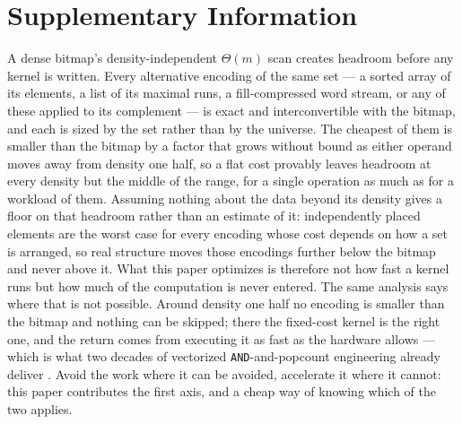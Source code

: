 %
%
\clearpage
\setcounter{figure}{0}
\setcounter{table}{0}
\setcounter{equation}{0}
\renewcommand{\theHequation}{S\arabic{equation}}
\setcounter{section}{0}

\section*{Supplementary Information}


\label{note:headroom}

A dense bitmap's density-independent $\Theta(m)$ scan creates headroom before any kernel is written.
Every alternative encoding of the same
set --- a sorted array of its elements, a list of its maximal runs, a fill-compressed word stream,
or any of these applied to its complement --- is exact and interconvertible with the bitmap, and
each is sized by the set rather than by the universe. The cheapest of them is smaller than the
bitmap by a factor that grows without bound as either operand moves away from density one half, so
a flat cost provably leaves headroom at every density but the middle of the range, for a single
operation as much as for a workload of them. Assuming nothing about the data beyond its density
gives a floor on that headroom rather than an estimate of it: independently placed elements are the
worst case for every encoding whose cost depends on how a set is arranged, so real structure moves
those encodings further below the bitmap and never above it. What this paper optimizes is
therefore not how fast a kernel runs but how much of the computation is never entered. The same
analysis says where that is not possible. Around density one half no encoding is smaller than the
bitmap and nothing can be skipped; there the fixed-cost kernel is the right one, and the return
comes from executing it as fast as the hardware allows --- which is what two decades of vectorized
\texttt{AND}-and-popcount engineering already deliver \cite{mula2018popcount}. Avoid the work where
it can be avoided, accelerate it where it cannot: this paper contributes the first axis, and a
cheap way of knowing which of the two applies.

